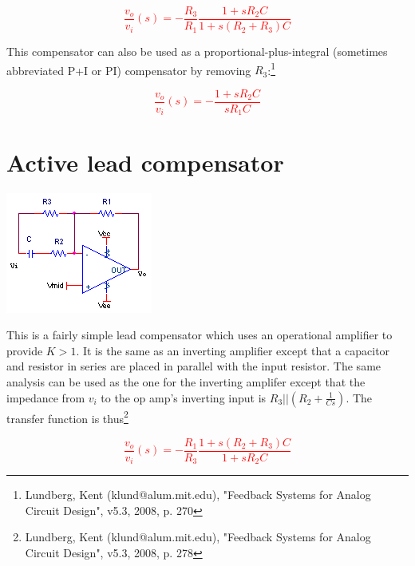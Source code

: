 \textcolor{red}{
\begin{equation}
\frac{v_{o}}{v_{i}}(s) = -\frac{R_{3}}{R_{1}}\frac{1+sR_{2}C}{1+s(R_{2} + R_{3})C}
\label{eq:activelag}
\end{equation}
}

This compensator can also be used as a proportional-plus-integral (sometimes abbreviated P+I or PI) compensator by removing $R_{3}$:\footnote{Lundberg, Kent (klund@alum.mit.edu), "Feedback Systems for Analog Circuit Design", v5.3, 2008, p. 270}

\textcolor{red}{
\begin{equation}
\frac{v_{o}}{v_{i}}(s) = - \frac{1+sR_{2}C}{sR_{1}C}
\label{eq:P+I}
\end{equation}
}

\section{Active lead compensator}
\begin{center}
	\includegraphics{schematics/activelead.PNG}
\end{center}
This is a fairly simple lead compensator which uses an operational amplifier to provide $K > 1$. It is the same as an inverting amplifier except that a capacitor and resistor in series are placed in parallel with the input resistor. The same analysis can be used as the one for the inverting amplifer except that the impedance from $v_{i}$ to the op amp's inverting input is $R_{3}||(R_{2}+\frac{1}{Cs})$. The transfer function is thus\footnote{Lundberg, Kent (klund@alum.mit.edu), "Feedback Systems for Analog Circuit Design", v5.3, 2008, p. 278}

\textcolor{red}{
\begin{equation}
\frac{v_{o}}{v_{i}}(s) = -\frac{R_{1}}{R_{3}}\frac{1+s(R_{2} + R_{3})C}{1+sR_{2}C}
\label{eq:activelead}
\end{equation}
}


